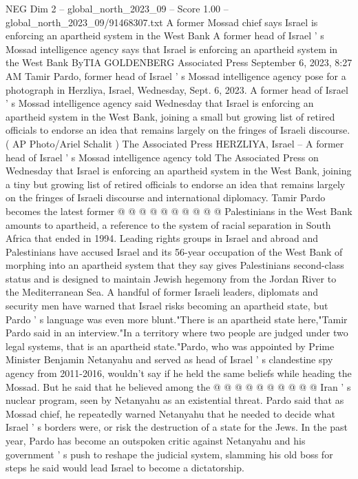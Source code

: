 \begin{textsample}{NEG Dim 2 – global\_north\_2023\_09 – Score 1.00 – global\_north\_2023\_09/91468307.txt}  \label{ex:f2_neg_070}
A former Mossad chief says Israel is enforcing an apartheid system in the West Bank A former head of Israel ' s Mossad intelligence agency says that Israel is enforcing an apartheid system in the West Bank ByTIA GOLDENBERG Associated Press September 6, 2023, 8:27 AM Tamir Pardo, former head of Israel ' s Mossad intelligence agency pose for a photograph in Herzliya, Israel, Wednesday, Sept. 6, 2023.
A former head of Israel ' s Mossad intelligence agency said Wednesday that Israel is enforcing an apartheid system in the West Bank, joining a small but growing list of retired officials to endorse an idea that remains largely on the fringes of Israeli discourse. ( AP Photo/Ariel Schalit ) The Associated Press HERZLIYA, Israel -- A former head of Israel ' s Mossad intelligence agency told The Associated Press on Wednesday that Israel is enforcing an apartheid system in the West Bank, joining a tiny but growing list of retired officials to endorse an idea that remains largely on the fringes of Israeli discourse and international diplomacy.
Tamir Pardo becomes the latest former @ @ @ @ @ @ @ @ @ @ Palestinians in the West Bank amounts to apartheid, a reference to the system of racial separation in South Africa that ended in 1994.
Leading rights groups in Israel and abroad and Palestinians have accused Israel and its 56-year occupation of the West Bank of morphing into an apartheid system that they say gives Palestinians second-class status and is designed to maintain Jewish hegemony from the Jordan River to the Mediterranean Sea.
A handful of former Israeli leaders, diplomats and security men have warned that Israel risks becoming an apartheid state, but Pardo ' s language was even more blunt."There is an apartheid state here,"Tamir Pardo said in an interview."In a territory where two people are judged under two legal systems, that is an apartheid state."Pardo, who was appointed by Prime Minister Benjamin Netanyahu and served as head of Israel ' s clandestine spy agency from 2011-2016, wouldn't say if he held the same beliefs while heading the Mossad.
But he said that he believed among the @ @ @ @ @ @ @ @ @ @ Iran ' s nuclear program, seen by Netanyahu as an existential threat.
Pardo said that as Mossad chief, he repeatedly warned Netanyahu that he needed to decide what Israel ' s borders were, or risk the destruction of a state for the Jews.
In the past year, Pardo has become an outspoken critic against Netanyahu and his government ' s push to reshape the judicial system, slamming his old boss for steps he said would lead Israel to become a dictatorship.

\end{textsample}
